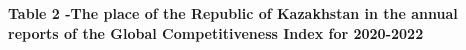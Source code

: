 {\bfseries Table 2 -The place of the Republic of Kazakhstan in the annual
reports of the Global Competitiveness Index for 2020-2022}

